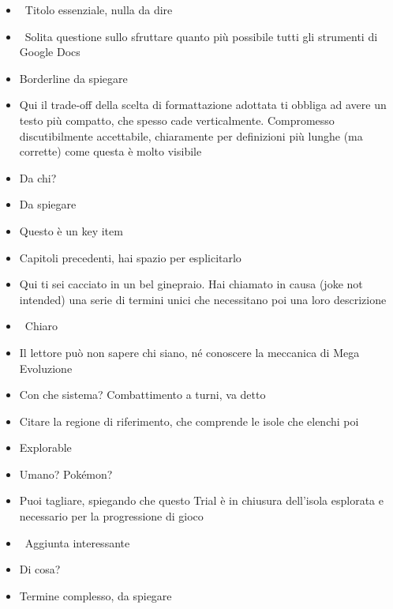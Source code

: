 {\small
\begin{itemize}
  \item {} \rvBene\ Titolo essenziale, nulla da dire
  \item \rvVuoto\ Solita questione sullo sfruttare quanto più possibile tutti gli strumenti di Google Docs
  \item {} Borderline da spiegare
  \item {} Qui il trade-off della scelta di formattazione adottata ti obbliga ad avere un testo più compatto, che spesso cade verticalmente. Compromesso discutibilmente accettabile, chiaramente per definizioni più lunghe (ma corrette) come questa è molto visibile
  \item {} Da chi?
  \item {} Da spiegare
  \item {} Questo è un key item
  \item {} Capitoli precedenti, hai spazio per esplicitarlo
  \item {} Qui ti sei cacciato in un bel ginepraio. Hai chiamato in causa (joke not intended) una serie di termini unici che necessitano poi una loro descrizione
  \item {} \rvBene\ Chiaro
  \item {} Il lettore può non sapere chi siano, né conoscere la meccanica di Mega Evoluzione
  \item {} Con che sistema? Combattimento a turni, va detto
  \item {} Citare la regione di riferimento, che comprende le isole che elenchi poi
  \item {} Explorable
  \item {} Umano? Pokémon?
  \item {} Puoi tagliare, spiegando che questo Trial è in chiusura dell'isola esplorata e necessario per la progressione di gioco
  \item {} \rvBene\ Aggiunta interessante
  \item {} Di cosa?
  \item {} Termine complesso, da spiegare

\end{itemize}}
